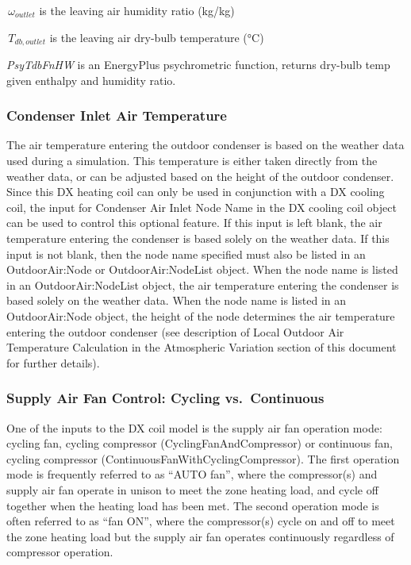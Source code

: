 \(\,{\omega_{outlet}}\) is the leaving air humidity ratio (kg/kg)

\(\,{T_{db,outlet}}\) is the leaving air dry-bulb temperature (°C)

\emph{PsyTdbFnHW} is an EnergyPlus psychrometric function, returns dry-bulb temp given enthalpy and humidity ratio.

\subsubsection{Condenser Inlet Air Temperature}\label{condenser-inlet-air-temperature-1}

The air temperature entering the outdoor condenser is based on the weather data used during a simulation. This temperature is either taken directly from the weather data, or can be adjusted based on the height of the outdoor condenser. Since this DX heating coil can only be used in conjunction with a DX cooling coil, the input for Condenser Air Inlet Node Name in the DX cooling coil object can be used to control this optional feature. If this input is left blank, the air temperature entering the condenser is based solely on the weather data. If this input is not blank, then the node name specified must also be listed in an OutdoorAir:Node or OutdoorAir:NodeList object. When the node name is listed in an OutdoorAir:NodeList object, the air temperature entering the condenser is based solely on the weather data. When the node name is listed in an OutdoorAir:Node object, the height of the node determines the air temperature entering the outdoor condenser (see description of Local Outdoor Air Temperature Calculation in the Atmospheric Variation section of this document for further details).

\subsubsection{Supply Air Fan Control: Cycling vs.~Continuous}\label{supply-air-fan-control-cycling-vs.continuous-1}

One of the inputs to the DX coil model is the supply air fan operation mode: cycling fan, cycling compressor (CyclingFanAndCompressor) or continuous fan, cycling compressor (ContinuousFanWithCyclingCompressor). The first operation mode is frequently referred to as ``AUTO fan'', where the compressor(s) and supply air fan operate in unison to meet the zone heating load, and cycle off together when the heating load has been met. The second operation mode is often referred to as ``fan ON'', where the compressor(s) cycle on and off to meet the zone heating load but the supply air fan operates continuously regardless of compressor operation.

